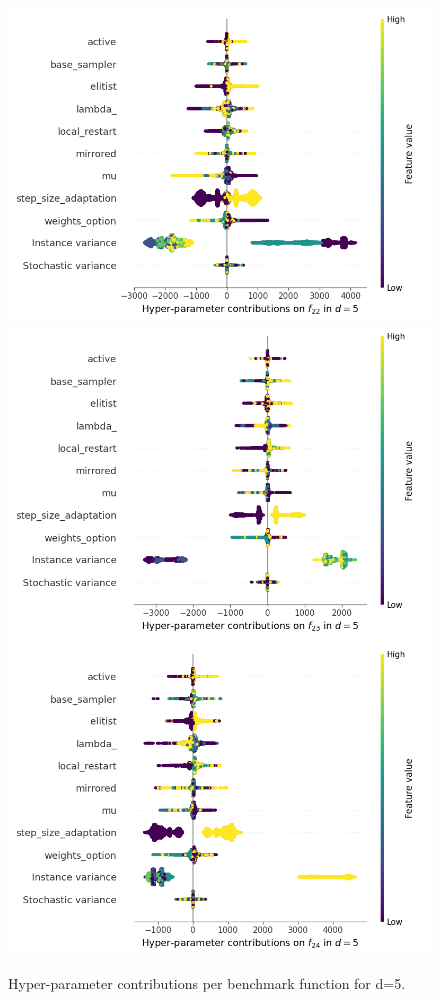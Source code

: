 \begin{figure}[t]
	\includegraphics[height=0.15\textheight,trim=60mm 0mm 30mm 0mm,clip]{cma_img_new/img_summary_f22_d5.png}
	\includegraphics[height=0.15\textheight,trim=60mm 0mm 30mm 0mm,clip]{cma_img_new/img_summary_f23_d5.png}
	\includegraphics[height=0.15\textheight,trim=60mm 0mm 0mm 0mm,clip]{cma_img_new/img_summary_f24_d5.png}
\caption{Hyper-parameter contributions per benchmark function for d=5. \label{fig:shapxplaind5}}

\end{figure}

